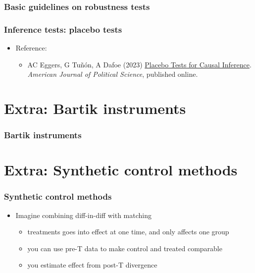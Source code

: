 \documentclass[aspectratio=43]{beamer}
\begin{document}
\begin{frame}
\frametitle{Basic guidelines on robustness tests}
\centering



\end{frame}

\begin{frame}
\frametitle{Inference tests: placebo tests}
\centering

\begin{itemize}
  \item Reference:
  \begin{itemize}
    \item AC Eggers, G Tuñón, A Dafoe (2023) \href{https://doi.org/10.1111/ajps.12818}{Placebo Tests for Causal Inference}. \textit{American Journal of Political Science}, published online.
  \end{itemize}
\end{itemize}

\end{frame}

\section{Extra: Bartik instruments}

\begin{frame}
\frametitle{Bartik instruments}
\centering



\end{frame}

\section{Extra: Synthetic control methods}

\begin{frame}
\frametitle{Synthetic control methods}
\centering

\begin{itemize}
  \item Imagine combining diff-in-diff with matching
  \begin{itemize}
    \item treatments goes into effect at one time, and only affects one group
    \item you can use pre-T data to make control and treated comparable
    \item you estimate effect from post-T divergence
  \end{itemize}
\end{itemize}

\end{frame}
\end{document}
